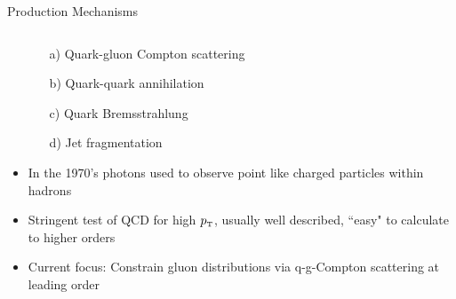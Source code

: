 \documentclass[aspectratio=169,10pt]{beamer}
\newcommand{\pT}          {\ensuremath{p_{\mbox{\tiny T}}}}
\begin{document}
\begin{frame}{Production Mechanisms}
\begin{columns}
\begin{column}{9cm}
\begin{itemize}
\begin{itemize}
              \item [a)] Quark-gluon Compton scattering
              \item [b)] Quark-quark annihilation
              \item [c)] Quark Bremsstrahlung
              \item [d)] Jet fragmentation
              \end{itemize}
        \item In the 1970's photons used to observe point like charged particles within hadrons
        \item Stringent test of QCD for high $\pT$, usually well described, ``easy" to calculate to higher orders
        \item Current focus: Constrain gluon distributions via q-g-Compton scattering at leading order
      \end{itemize}
    \end{column}
   \end{columns}
  \end{frame}
\end{document}

